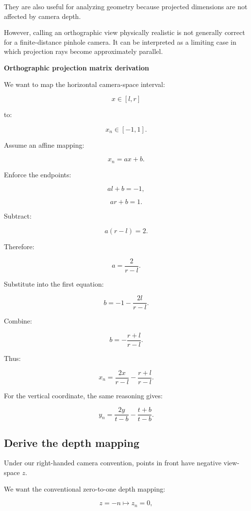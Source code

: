 They are also useful for analyzing geometry because projected dimensions are not affected by camera depth.

However, calling an orthographic view physically realistic is not generally correct for a finite-distance pinhole camera. It can be interpreted as a limiting case in which projection rays become approximately parallel.

\textbf{Orthographic projection matrix derivation}

We want to map the horizontal camera-space interval:

\[
 x\in[l,r]
\]

to:

\[
 x_n\in[-1,1].
\]

Assume an affine mapping:

\[
 x_n=ax+b.
\]

Enforce the endpoints:

\[
 al+b=-1,
\]

\[
 ar+b=1.
\]

Subtract:

\[
 a(r-l)=2.
\]

Therefore:

\[
 \boxed{ a=\frac2{r-l} }.
\]

Substitute into the first equation:

\[
 b=-1-\frac{2l}{r-l}.
\]

Combine:

\[
 \boxed{ b=-\frac{r+l}{r-l} }.
\]

Thus:

\[
 \boxed{ x_n= \frac{2x}{r-l} -\frac{r+l}{r-l} }.
\]

For the vertical coordinate, the same reasoning gives:

\[
 \boxed{ y_n= \frac{2y}{t-b} -\frac{t+b}{t-b} }.
\]

\subsection{Derive the depth mapping}\label{02-foundations-ii-ch033-derive-the-depth-mapping}

\hypertarget{02-foundations-ii-ch033-derive-the-depth-mapping}{}

Under our right-handed camera convention, points in front have negative view-space \(z\).

We want the conventional zero-to-one depth mapping:

\[
 z=-n\longmapsto z_n=0,
\]

